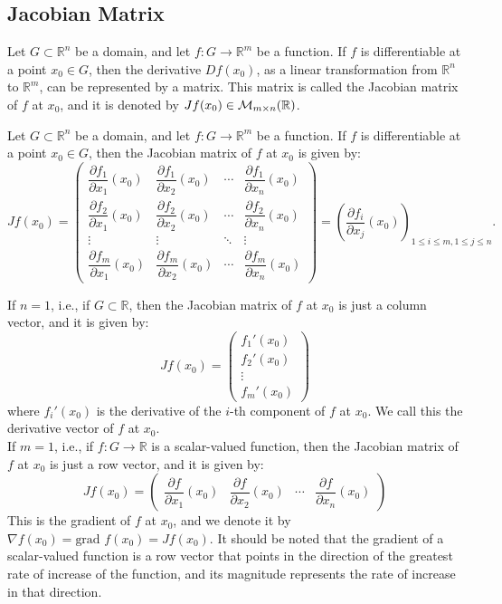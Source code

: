 \subsection{Jacobian Matrix}

Let $G\subset \mathbb{R}^n$ be a domain, and let $f : G \to \mathbb{R}^m$ be a function. If $f$ is differentiable at a point $x_0 \in G$, then the derivative $Df(x_0)$, as a linear transformation from $\mathbb{R}^n$ to $\mathbb{R}^m$, can be represented by a matrix. This matrix is called the Jacobian matrix of $f$ at $x_0$, and it is denoted by $Jf(x_0)\in \mathcal{M}_{m \times n}(\mathbb{R})$.
\begin{prop}
    Let $G\subset \mathbb{R}^n$ be a domain, and let $f : G \to \mathbb{R}^m$ be a function. If $f$ is differentiable at a point $x_0 \in G$, then the Jacobian matrix of $f$ at $x_0$ is given by:
    \[
        Jf(x_0) = \begin{pmatrix}
            \dfrac{\partial f_1}{\partial x_1}(x_0) & \dfrac{\partial f_1}{\partial x_2}(x_0) & \cdots & \dfrac{\partial f_1}{\partial x_n}(x_0) \\
            \dfrac{\partial f_2}{\partial x_1}(x_0) & \dfrac{\partial f_2}{\partial x_2}(x_0) & \cdots & \dfrac{\partial f_2}{\partial x_n}(x_0) \\
            \vdots & \vdots & \ddots & \vdots \\
            \dfrac{\partial f_m}{\partial x_1}(x_0) & \dfrac{\partial f_m}{\partial x_2}(x_0) & \cdots & \dfrac{\partial f_m}{\partial x_n}(x_0)
        \end{pmatrix}
        = \left( \dfrac{\partial f_i}{\partial x_j}(x_0) \right)_{1 \leq i \leq m, 1 \leq j \leq n}.
    \]
\end{prop}

If $n=1$, i.e., if $G\subset \mathbb{R}$, then the Jacobian matrix of $f$ at $x_0$ is just a column vector, and it is given by:
\[
    Jf(x_0) = \begin{pmatrix}
        f_1'(x_0) \\
        f_2'(x_0) \\
        \vdots \\
        f_m'(x_0)
    \end{pmatrix}
\]
where $f_i'(x_0)$ is the derivative of the $i$-th component of $f$ at $x_0$. We call this the derivative vector of $f$ at $x_0$.\\

If $m=1$, i.e., if $f : G \to \mathbb{R}$ is a scalar-valued function, then the Jacobian matrix of $f$ at $x_0$ is just a row vector, and it is given by:
\[
    Jf(x_0) = \begin{pmatrix}
        \dfrac{\partial f}{\partial x_1}(x_0) & \dfrac{\partial f}{\partial x_2}(x_0) & \cdots & \dfrac{\partial f}{\partial x_n}(x_0)
    \end{pmatrix}
\]
This is the gradient of $f$ at $x_0$, and we denote it by $\nabla f(x_0)=\text{grad } f(x_0)=Jf(x_0)$. It should be noted that the gradient of a scalar-valued function is a row vector that points in the direction of the greatest rate of increase of the function, and its magnitude represents the rate of increase in that direction.



